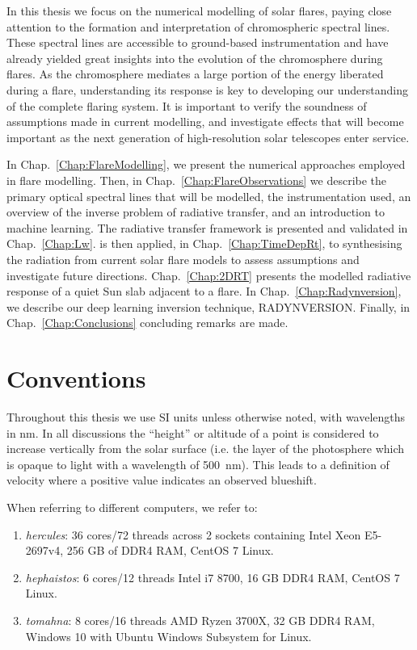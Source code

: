 In this thesis we focus on the numerical modelling of solar flares, paying close attention to the formation and interpretation of chromospheric spectral lines.
These spectral lines are accessible to ground-based instrumentation and have already yielded great insights into the evolution of the chromosphere during flares.
As the chromosphere mediates a large portion of the energy liberated during a flare, understanding its response is key to developing our understanding of the complete flaring system.
It is important to verify the soundness of assumptions made in current modelling, and investigate effects that will become important as the next generation of high-resolution solar telescopes enter service.

In Chap.~\ref{Chap:FlareModelling}, we present the numerical approaches employed in flare modelling.
Then, in Chap.~\ref{Chap:FlareObservations} we describe the primary optical spectral lines that will be modelled, the instrumentation used, an overview of the inverse problem of radiative transfer, and an introduction to machine learning.
The \Lw{} radiative transfer framework is presented and validated in Chap.~\ref{Chap:Lw}.
\Lw{} is then applied, in Chap.~\ref{Chap:TimeDepRt}, to synthesising the radiation from current solar flare models to assess assumptions and investigate future directions.
Chap.~\ref{Chap:2DRT} presents the modelled radiative response of a quiet Sun slab adjacent to a flare.
In Chap.~\ref{Chap:Radynversion}, we describe our deep learning inversion technique, RADYNVERSION.
Finally, in Chap.~\ref{Chap:Conclusions} concluding remarks are made.


\section{Conventions}\label{Sec:Conventions}

Throughout this thesis we use SI units unless otherwise noted, with wavelengths in \si{\nano\m}.
In all discussions the ``height'' or altitude of a point is considered to increase vertically from the solar surface (i.e. the layer of the photosphere which is opaque to light with a wavelength of \SI{500}{\nano\m}).
This leads to a definition of velocity where a positive value indicates an observed blueshift.

When referring to different computers, we refer to:
\begin{enumerate}
    \item \emph{hercules}: 36 cores/72 threads across 2 sockets containing Intel Xeon E5-2697v4, 256 GB of DDR4 RAM, CentOS 7 Linux.
    \item \emph{hephaistos}: 6 cores/12 threads Intel i7 8700, 16 GB DDR4 RAM, CentOS 7 Linux.
    \item \emph{tomahna}: 8 cores/16 threads AMD Ryzen 3700X, 32 GB DDR4 RAM, Windows 10 with Ubuntu Windows Subsystem for Linux.
\end{enumerate}

